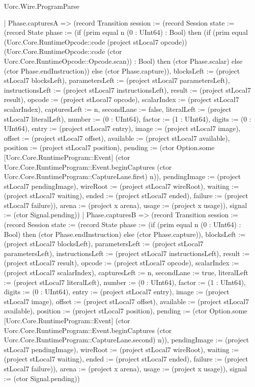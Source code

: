 \begin{lexlean}{Uorc.Wire.ProgramParse}
\begin{semanticmodule}
{    | Phase.capturesA => (record Transition {session := (record Session {state := (record State {phase := (if (prim equal n (0 : UInt64) : Bool) then (if (prim equal (Uorc.Core.RuntimeOpcode::code (project stLocal7 opcode)) (Uorc.Core.RuntimeOpcode::code (ctor Uorc.Core.RuntimeOpcode::Opcode.scan)) : Bool) then (ctor Phase.scalar) else (ctor Phase.endInstruction)) else (ctor Phase.capture)), blocksLeft := (project stLocal7 blocksLeft), parametersLeft := (project stLocal7 parametersLeft), instructionsLeft := (project stLocal7 instructionsLeft), result := (project stLocal7 result), opcode := (project stLocal7 opcode), scalarIndex := (project stLocal7 scalarIndex), capturesLeft := n, secondLane := false, literalLeft := (project stLocal7 literalLeft), number := (0 : UInt64), factor := (1 : UInt64), digits := (0 : UInt64), entry := (project stLocal7 entry), image := (project stLocal7 image), offset := (project stLocal7 offset), available := (project stLocal7 available), position := (project stLocal7 position), pending := (ctor Option.some [Uorc.Core.RuntimeProgram::Event] (ctor Uorc.Core.RuntimeProgram::Event.beginCaptures (ctor Uorc.Core.RuntimeProgram::CaptureLane.first) n)), pendingImage := (project stLocal7 pendingImage), wireRoot := (project stLocal7 wireRoot), waiting := (project stLocal7 waiting), ended := (project stLocal7 ended), failure := (project stLocal7 failure)}), arena := (project x arena), usage := (project x usage)}), signal := (ctor Signal.pending)})
    | Phase.capturesB => (record Transition {session := (record Session {state := (record State {phase := (if (prim equal n (0 : UInt64) : Bool) then (ctor Phase.endInstruction) else (ctor Phase.capture)), blocksLeft := (project stLocal7 blocksLeft), parametersLeft := (project stLocal7 parametersLeft), instructionsLeft := (project stLocal7 instructionsLeft), result := (project stLocal7 result), opcode := (project stLocal7 opcode), scalarIndex := (project stLocal7 scalarIndex), capturesLeft := n, secondLane := true, literalLeft := (project stLocal7 literalLeft), number := (0 : UInt64), factor := (1 : UInt64), digits := (0 : UInt64), entry := (project stLocal7 entry), image := (project stLocal7 image), offset := (project stLocal7 offset), available := (project stLocal7 available), position := (project stLocal7 position), pending := (ctor Option.some [Uorc.Core.RuntimeProgram::Event] (ctor Uorc.Core.RuntimeProgram::Event.beginCaptures (ctor Uorc.Core.RuntimeProgram::CaptureLane.second) n)), pendingImage := (project stLocal7 pendingImage), wireRoot := (project stLocal7 wireRoot), waiting := (project stLocal7 waiting), ended := (project stLocal7 ended), failure := (project stLocal7 failure)}), arena := (project x arena), usage := (project x usage)}), signal := (ctor Signal.pending)})
}
\end{semanticmodule}
\end{lexlean}
